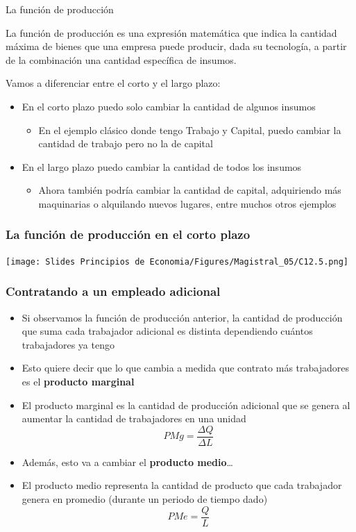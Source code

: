 \documentclass{beamer}
\begin{document}
\begin{frame}{La función de producción}
    \begin{boxA}
        \begin{center}
            La función de producción es una expresión matemática que indica la cantidad máxima de bienes que una empresa puede producir, dada su tecnología, a partir de la combinación una cantidad específica de insumos.
        \end{center}
    \end{boxA}
    Vamos a diferenciar entre el corto y el largo plazo:
    \begin{itemize}
        \item En el corto plazo puedo solo cambiar la cantidad de algunos insumos
        \begin{itemize}
            \item En el ejemplo clásico donde tengo Trabajo y Capital, puedo cambiar la cantidad de trabajo pero no la de capital
        \end{itemize}
        \item En el largo plazo puedo cambiar la cantidad de todos los insumos
        \begin{itemize}
            \item Ahora también podría cambiar la cantidad de capital, adquiriendo más maquinarias o alquilando nuevos lugares, entre muchos otros ejemplos
        \end{itemize}
    \end{itemize}
\end{frame}


\begin{frame}
\frametitle{La función de producción en el corto plazo}
\centering
\texttt{[image: Slides Principios de Economia/Figures/Magistral\_05/C12.5.png]}
\end{frame}

\begin{frame}
    \frametitle{Contratando a un empleado adicional}
    \begin{itemize}
        \item Si observamos la función de producción anterior, la cantidad de producción que suma cada trabajador adicional es distinta dependiendo cuántos trabajadores ya tengo
        \item Esto quiere decir que lo que cambia a medida que contrato más trabajadores es el \textbf{producto marginal}
        \item El producto marginal es la cantidad de producción adicional que se genera al aumentar la cantidad de trabajadores en una unidad
        \[ PMg = \frac{\Delta Q}{\Delta L} \]
        \item Además, esto va a cambiar el \textbf{producto medio}\dots
        \item El producto medio representa la cantidad de producto que cada trabajador genera en promedio (durante un periodo de tiempo dado)
        \[ PMe = \frac{Q}{L} \]
    \end{itemize}
\end{frame}
\end{document}
